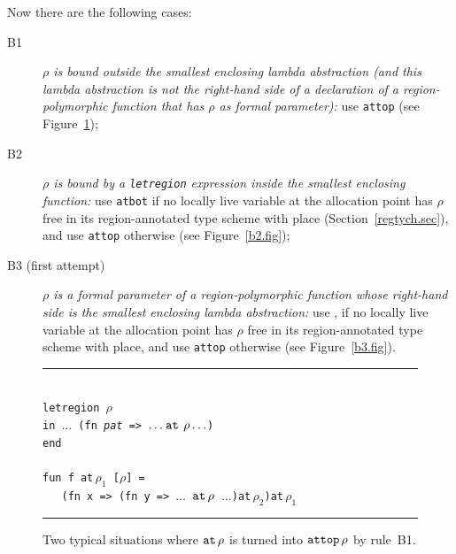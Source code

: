 \documentclass[12pt]{book}
\begin{document}
Now there are the following cases:
\begin{description}
\item[B1] {\it $\rho$ is bound outside the smallest enclosing lambda abstraction
      (and this lambda abstraction is not the right-hand side of a 
      declaration of a region-polymorphic function that has $\rho$ as
      formal parameter):}
      use {\tt attop} (see Figure~\ref{b1.fig});
\item[B2]{\it $\rho$ is bound by a {\tt letregion} expression inside the
      smallest enclosing function:} use {\tt atbot} if no locally live
      variable at the allocation point has $\rho$ free in its region-annotated
      type scheme with place (Section~\ref{regtych.sec}), and use {\tt attop} otherwise 
      (see Figure~\ref{b2.fig});
    \item[B3 (first attempt)]{\it $\rho$ is a formal parameter of a
        region-polymorphic function whose right-hand side is the
        smallest enclosing lambda abstraction:} use , if no locally live variable at the
      allocation point has $\rho$ free in its region-annotated type scheme with place, and
      use {\tt attop} otherwise (see Figure~\ref{b3.fig}).
\end{description}
\begin{figure}
\hrule
\begin{center}
\begin{tabbing}
\\
\hskip3cm\=\tt letregion $\rho$\\
       \>\tt in $\ldots$ (fn {\it pat} => $\ldots\mathbin{\hbox{\tt at}}\,\rho\ldots$)\\
       \>\tt end\\
\\
       \>\tt fun f at$\,\rho_1$ [$\rho$] =\\
       \>\tt\ \ \ (fn x => (fn y => $\ldots$ $\mathbin{\hbox{\tt at}}\,\rho$ $\ldots$)at$\,\rho_2$)at$\,\rho_1$\\
\end{tabbing}
\end{center}
\caption{Two typical situations where $\mathbin{\hbox{\tt at}}\,\rho$ is turned into $\hbox{\tt attop}\,\rho$
by rule~B1.}
\medskip
\hrule
\label{b1.fig}
\end{figure}
\end{document}
